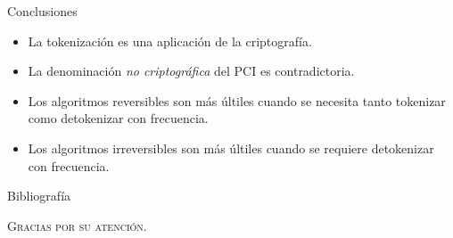 \documentclass{beamer}
\begin{document}
  \begin{frame}{Conclusiones}
    \begin{itemize}
      \item La tokenización es una aplicación de la criptografía.
      \item La denominación \textit{no criptográfica} del PCI es contradictoria.
      \item Los algoritmos reversibles son más últiles cuando se necesita tanto
        tokenizar como detokenizar con frecuencia.
      \item Los algoritmos irreversibles son más últiles cuando se requiere
        detokenizar con frecuencia.
    \end{itemize}
  \end{frame}

  \begin{frame}[allowframebreaks]{Bibliografía}
    \printbibliography
  \end{frame}

  \begin{frame}{}
    \centering \Huge
    \textsc{Gracias por su atención.}
  \end{frame}

  \setlength{\parskip}{0.0em}

  {
  \frame{\titlepage}}
\end{document}
